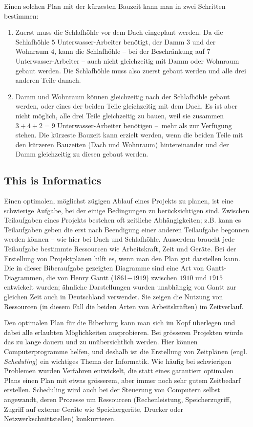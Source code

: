 \documentclass[a4paper,11pt]{report}
\begin{document}
Einen solchen Plan mit der kürzesten Bauzeit kann man in zwei Schritten bestimmen:

\begin{enumerate}
  \item Zuerst muss die Schlafhöhle vor dem Dach eingeplant werden. Da die Schlafhöhle $5$ Unterwasser-Arbeiter benötigt, der Damm $3$ und der Wohnraum $4$, kann die Schlafhöhle – bei der Beschränkung auf $7$ Unterwasser-Arbeiter – auch nicht gleichzeitig mit Damm oder Wohnraum gebaut werden. Die Schlafhöhle muss also zuerst gebaut werden und alle drei anderen Teile danach.
  \item Damm und Wohnraum können gleichzeitig nach der Schlafhöhle gebaut werden, oder eines der beiden Teile gleichzeitig mit dem Dach. Es ist aber nicht möglich, alle drei Teile gleichzeitig zu bauen, weil sie zusammen ${3 + 4 + 2 = 9}$ Unterwasser-Arbeiter benötigen –~mehr als zur Verfügung stehen. Die kürzeste Bauzeit kann erzielt werden, wenn die beiden Teile mit den kürzeren Bauzeiten (Dach und Wohnraum) hintereinander und der Damm gleichzeitig zu diesen gebaut werden.
\end{enumerate}


\subsection*{This is Informatics}

Einen optimalen, möglichst zügigen Ablauf eines Projekts zu planen, ist eine schwierige Aufgabe, bei der einige Bedingungen zu berücksichtigen sind. Zwischen Teilaufgaben eines Projekts bestehen oft zeitliche Abhängigkeiten; z.B. kann es Teilaufgaben geben die erst nach Beendigung einer anderen Teilaufgabe begonnen werden können – wie hier bei Dach und Schlafhöhle.  Ausserdem braucht jede Teilaufgabe bestimmte Ressourcen wie Arbeitskraft, Zeit und Geräte. Bei der Erstellung von Projektplänen hilft es, wenn man den Plan gut darstellen kann. Die in dieser Biberaufgabe gezeigten Diagramme sind eine Art von Gantt-Diagrammen, die von Henry Gantt (1861$-1919$) zwischen $1910$ und $1915$ entwickelt wurden; ähnliche Darstellungen wurden unabhängig von Gantt zur gleichen Zeit auch in Deutschland verwendet. Sie zeigen die Nutzung von Ressourcen (in diesem Fall die beiden Arten von Arbeitskräften) im Zeitverlauf.

Den optimalen Plan für die Biberburg kann man sich im Kopf überlegen und dabei alle erlaubten Möglichkeiten ausprobieren.  Bei grösseren Projekten würde das zu lange dauern und zu unübersichtlich werden. Hier können Computerprogramme helfen, und deshalb ist die Erstellung von Zeitplänen (engl. \emph{Scheduling}) ein wichtiges Thema der Informatik. Wie häufig bei schwierigen Problemen wurden Verfahren entwickelt, die statt eines garantiert optimalen Plans einen Plan mit etwas grösserem, aber immer noch sehr gutem Zeitbedarf erstellen. Scheduling wird auch bei der Steuerung von Computern selbst angewandt, deren Prozesse um Ressourcen (Rechenleistung, Speicherzugriff, Zugriff auf externe Geräte wie Speichergeräte, Drucker oder Netzwerkschnittstellen) konkurrieren.
\end{document}
